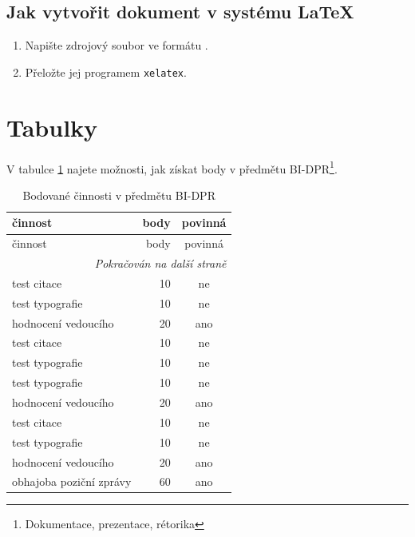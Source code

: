 \documentclass{article}
\begin{document}
\subsection{Jak vytvořit dokument v systému \LaTeX}
\begin{enumerate}
    \item Napište zdrojový soubor ve formátu \LaTeXe.
    \item Přeložte jej programem \verb|xelatex|.
\end{enumerate}
\section{Tabulky} 
V tabulce \ref{tab:bodovane-cinnosti} najete možnosti, jak získat body v
předmětu BI-DPR\footnote{Dokumentace, prezentace, rétorika}.


    \begin{longtable}{p{3.5cm}|r|c}
    	\caption{Bodované činnosti v předmětu BI-DPR}
    	 \label{tab:bodovane-cinnosti}
    	\\
         činnost                    & body  & povinná \\ \hline \hline
         \endfirsthead
          činnost                    & body  & povinná \\ \hline \hline
         \endhead
        
         \multicolumn{3}{r}{\textit{Pokračován na další straně}} \\
         \endfoot
        
        \endlastfoot
         
         test citace                & 10    & ne \\ \hline
         test typografie            & 10    & ne \\ \hline
         hodnocení vedoucího        & 20    & ano \\ \hline
         test citace                & 10    & ne \\ \hline
         test typografie            & 10    & ne \\ \hline
         test typografie            & 10    & ne \\ \hline
         hodnocení vedoucího        & 20    & ano \\ \hline
         test citace                & 10    & ne \\ \hline
         test typografie            & 10    & ne \\ \hline
         hodnocení vedoucího        & 20    & ano \\ \hline
         obhajoba poziční zprávy    & 60    & ano \\ \hline
         
         
   
    \end{longtable}
    
\end{document}
